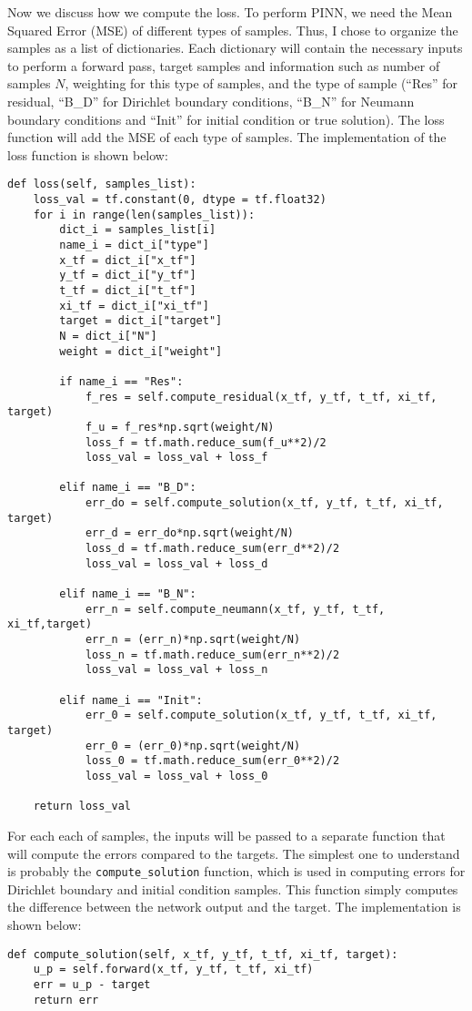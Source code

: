 \documentclass{article}
\begin{document}
Now we discuss how we compute the loss. To perform PINN, we need the Mean Squared Error (MSE) of different types of samples. Thus, I chose to organize the samples as a list of dictionaries. Each dictionary will contain the necessary inputs to perform a forward pass, target samples and information such as number of samples $N$, weighting for this type of samples, and the type of sample (``Res'' for residual, ``B\_D'' for Dirichlet boundary conditions, ``B\_N'' for Neumann boundary conditions and ``Init'' for initial condition or true solution). The loss function will add the MSE of each type of samples. The implementation of the loss function is shown below:

\begin{lstlisting}
def loss(self, samples_list):
	loss_val = tf.constant(0, dtype = tf.float32)
	for i in range(len(samples_list)):
		dict_i = samples_list[i]
		name_i = dict_i["type"]
		x_tf = dict_i["x_tf"]
		y_tf = dict_i["y_tf"]
		t_tf = dict_i["t_tf"]
		xi_tf = dict_i["xi_tf"]
		target = dict_i["target"]
		N = dict_i["N"]
		weight = dict_i["weight"]

		if name_i == "Res":
			f_res = self.compute_residual(x_tf, y_tf, t_tf, xi_tf, target)
			f_u = f_res*np.sqrt(weight/N)
			loss_f = tf.math.reduce_sum(f_u**2)/2
			loss_val = loss_val + loss_f

		elif name_i == "B_D":
			err_do = self.compute_solution(x_tf, y_tf, t_tf, xi_tf, target)
			err_d = err_do*np.sqrt(weight/N)
			loss_d = tf.math.reduce_sum(err_d**2)/2
			loss_val = loss_val + loss_d
				
		elif name_i == "B_N":
			err_n = self.compute_neumann(x_tf, y_tf, t_tf, xi_tf,target)
			err_n = (err_n)*np.sqrt(weight/N)
			loss_n = tf.math.reduce_sum(err_n**2)/2
			loss_val = loss_val + loss_n

		elif name_i == "Init":
			err_0 = self.compute_solution(x_tf, y_tf, t_tf, xi_tf, target)
			err_0 = (err_0)*np.sqrt(weight/N)
			loss_0 = tf.math.reduce_sum(err_0**2)/2
			loss_val = loss_val + loss_0

	return loss_val
\end{lstlisting}

For each each of samples, the inputs will be passed to a separate function that will compute the errors compared to the targets. The simplest one to understand is probably the \texttt{compute\_solution} function, which is used in computing errors for Dirichlet boundary and initial condition samples. This function simply computes the difference between the network output and the target. The implementation is shown below:
\begin{lstlisting}
def compute_solution(self, x_tf, y_tf, t_tf, xi_tf, target):
	u_p = self.forward(x_tf, y_tf, t_tf, xi_tf)
	err = u_p - target
	return err
\end{lstlisting}
\end{document}
